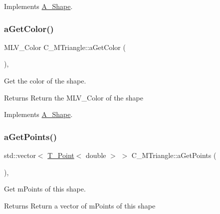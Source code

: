 Implements \hyperlink{classA__Shape_a1b142ee2d873d6c217f65de1632e7b6e}{A\+\_\+\+Shape}.

\mbox{\label{classC__MTriangle_aa567d77ce0e6d664beb6eea9268b1bc3}} 
\subsubsection{\texorpdfstring{a\+Get\+Color()}{aGetColor()}}
{\footnotesize\ttfamily M\+L\+V\+\_\+\+Color C\+\_\+\+M\+Triangle\+::a\+Get\+Color (\begin{DoxyParamCaption}{ }\end{DoxyParamCaption})\hspace{0.3cm}{\ttfamily [override]}, {\ttfamily [virtual]}}



Get the color of the shape. 

\begin{DoxyReturn}{Returns}
Return the M\+L\+V\+\_\+\+Color of the shape 
\end{DoxyReturn}


Implements \hyperlink{classA__Shape_a1e90c8132d33e4ac84d42f72606193b2}{A\+\_\+\+Shape}.

\mbox{\label{classC__MTriangle_ada409f8f1015cf7bf9f9ab8fb11da94b}} 
\subsubsection{\texorpdfstring{a\+Get\+Points()}{aGetPoints()}}
{\footnotesize\ttfamily std\+::vector$<$ \hyperlink{classT__Point}{T\+\_\+\+Point}$<$ double $>$ $>$ C\+\_\+\+M\+Triangle\+::a\+Get\+Points (\begin{DoxyParamCaption}{ }\end{DoxyParamCaption})\hspace{0.3cm}{\ttfamily [override]}, {\ttfamily [virtual]}}



Get m\+Points of this shape. 

\begin{DoxyReturn}{Returns}
Return a vector of m\+Points of this shape 
\end{DoxyReturn}


